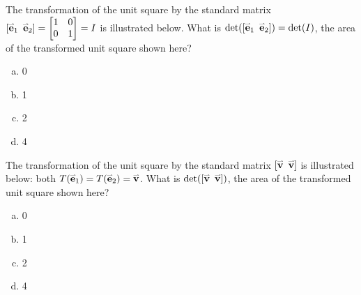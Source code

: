 \begin{activity}{2}
The transformation of the unit square by the
standard matrix \([\vec{e}_1\hspace{0.5em} \vec{e}_2]=\begin{bmatrix}1&0\\0&1\end{bmatrix}=I\) is illustrated below.
What is \(\det([\vec{e}_1\hspace{0.5em} \vec{e}_2])=\det(I)\), the
area of the transformed unit square shown here?
\begin{center}
\end{center}
  \begin{enumerate}[a)]
    \item 0
    \item 1
    \item 2
    \item 4
  \end{enumerate}
\end{activity}

\begin{activity}{2}
The transformation of the unit square by the
standard matrix \([\vec{v}\hspace{0.5em} \vec{v}]\) is illustrated below: both
\(T(\vec{e}_1)=T(\vect{e}_2)=\vec{v}\).
What is \(\det([\vec{v}\hspace{0.5em} \vec{v}])\), 
the area of the transformed unit square shown here?
\begin{center}
\end{center}
  \begin{enumerate}[a)]
    \item 0
    \item 1
    \item 2
    \item 4
  \end{enumerate}
\end{activity}


